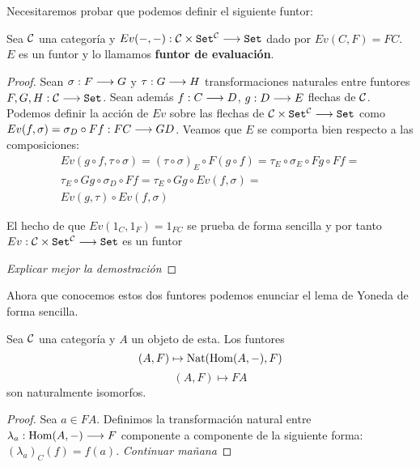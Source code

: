 Necesitaremos probar que podemos definir el siguiente funtor:

\begin{proposition*}
  Sea $\mathcal{C}$ una categoría y $Ev(-, -) : \mathcal{C}\times\texttt{Set}^{\mathcal{C}}\longrightarrow \texttt{Set}$
  dado por $Ev(C, F) = FC$. $E$ es un funtor y lo llamamos
  \textbf{funtor de evaluación}.
\end{proposition*}
\begin{proof}
  Sean $\sigma : F\longrightarrow G$ y $\tau : G\longrightarrow H$ transformaciones naturales entre funtores
  $F, G, H : \mathcal{C}\longrightarrow \texttt{Set}$. Sean además $f : C\longrightarrow D$,
  $g : D\longrightarrow E$ flechas de $\mathcal{C}$.
  Podemos definir la acción de $Ev$ sobre las flechas de
  $\mathcal{C}\times\texttt{Set}^{\mathcal{C}}\longrightarrow \texttt{Set}$ como
  $Ev(f, \sigma) = \sigma_D \circ Ff : FC\longrightarrow GD$. Veamos que $E$ se comporta bien
  respecto a las composiciones:
  \begin{multline*}
    Ev(g \circ f, \tau\circ\sigma) =
    (\tau \circ \sigma)_E\circ F(g\circ f) =
    \tau_E\circ\sigma_E\circ Fg \circ Ff = \\
  \tau_E\circ Gg \circ\sigma_D \circ Ff =
  \tau_E\circ Gg \circ Ev(f, \sigma) =\\
  Ev(g, \tau) \circ Ev(f, \sigma)
  \end{multline*}

  El hecho de que $Ev(1_C, 1_F) = 1_{FC}$ se prueba de forma sencilla
  y por tanto $Ev : \mathcal{C}\times\texttt{Set}^{\mathcal{C}}\longrightarrow \texttt{Set}$ es un funtor

  \textit{Explicar mejor la demostración}
\end{proof}

Ahora que conocemos estos dos funtores podemos enunciar el lema
de Yoneda de forma sencilla.

\begin{theorem}
  Sea $\mathcal{C}$ una categoría y $A$ un objeto de esta. Los funtores
  $$(A, F) \mapsto \operatorname{Nat}(\operatorname{Hom}(A, -), F)$$
  $$(A, F) \mapsto FA$$
  son naturalmente isomorfos.
\end{theorem}
\begin{proof}
  Sea $a \in F A$. Definimos la transformación natural entre
  $\lambda_a : \operatorname{Hom}(A, -)\longrightarrow F$ componente a componente de
  la siguiente forma: $(\lambda_a)_C(f) = f(a)$.
  \textit{Continuar mañana}
\end{proof}
